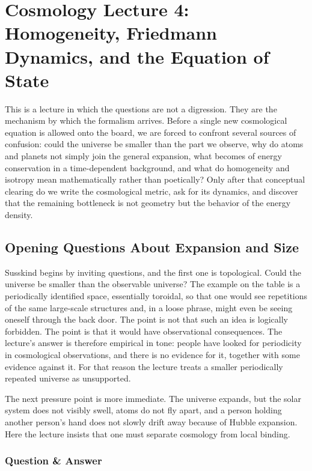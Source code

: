 \chapter{Cosmology Lecture 4: Homogeneity, Friedmann Dynamics, and the Equation of State}

This is a lecture in which the questions are not a digression. They are the mechanism by which the formalism arrives. Before a single new cosmological equation is allowed onto the board, we are forced to confront several sources of confusion: could the universe be smaller than the part we observe, why do atoms and planets not simply join the general expansion, what becomes of energy conservation in a time-dependent background, and what do homogeneity and isotropy mean mathematically rather than poetically? Only after that conceptual clearing do we write the cosmological metric, ask for its dynamics, and discover that the remaining bottleneck is not geometry but the behavior of the energy density.

\section{Opening Questions About Expansion and Size}

Susskind begins by inviting questions, and the first one is topological. Could the universe be smaller than the observable universe? The example on the table is a periodically identified space, essentially toroidal, so that one would see repetitions of the same large-scale structures and, in a loose phrase, might even be seeing oneself through the back door. The point is not that such an idea is logically forbidden. The point is that it would have observational consequences. The lecture's answer is therefore empirical in tone: people have looked for periodicity in cosmological observations, and there is no evidence for it, together with some evidence against it. For that reason the lecture treats a smaller periodically repeated universe as unsupported.

The next pressure point is more immediate. The universe expands, but the solar system does not visibly swell, atoms do not fly apart, and a person holding another person's hand does not slowly drift away because of Hubble expansion. Here the lecture insists that one must separate cosmology from local binding.

\subsection{Question \& Answer}

